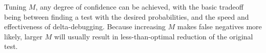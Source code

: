 Tuning $M$, any degree of confidence can be achieved, with
the basic tradeoff being between finding a test with the desired
probabilities, and the speed and effectiveness of delta-debugging.
Because increasing $M$ makes false negatives more likely, larger $M$
will usually result in less-than-optimal reduction of the original
test.